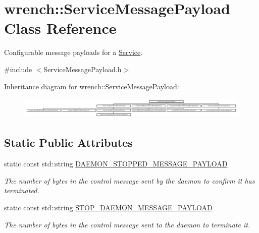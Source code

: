 \hypertarget{classwrench_1_1_service_message_payload}{}\section{wrench\+:\+:Service\+Message\+Payload Class Reference}
\label{classwrench_1_1_service_message_payload}


Configurable message payloads for a \hyperlink{classwrench_1_1_service}{Service}.  




{\ttfamily \#include $<$Service\+Message\+Payload.\+h$>$}

Inheritance diagram for wrench\+:\+:Service\+Message\+Payload\+:\begin{figure}[H]
\begin{center}
\leavevmode
\includegraphics[height=1.039926cm]{classwrench_1_1_service_message_payload}
\end{center}
\end{figure}
\subsection*{Static Public Attributes}
\begin{DoxyCompactItemize}
\item 
\mbox{\label{classwrench_1_1_service_message_payload_aec363c9226bc8285c41d9fff8c2814a9}} 
static const std\+::string \hyperlink{classwrench_1_1_service_message_payload_aec363c9226bc8285c41d9fff8c2814a9}{D\+A\+E\+M\+O\+N\+\_\+\+S\+T\+O\+P\+P\+E\+D\+\_\+\+M\+E\+S\+S\+A\+G\+E\+\_\+\+P\+A\+Y\+L\+O\+AD}
\begin{DoxyCompactList}\small\item\em The number of bytes in the control message sent by the daemon to confirm it has terminated. \end{DoxyCompactList}\item 
\mbox{\label{classwrench_1_1_service_message_payload_a9efb4a6b2c8876e17a3f636ba5ac17f6}} 
static const std\+::string \hyperlink{classwrench_1_1_service_message_payload_a9efb4a6b2c8876e17a3f636ba5ac17f6}{S\+T\+O\+P\+\_\+\+D\+A\+E\+M\+O\+N\+\_\+\+M\+E\+S\+S\+A\+G\+E\+\_\+\+P\+A\+Y\+L\+O\+AD}
\begin{DoxyCompactList}\small\item\em The number of bytes in the control message sent to the daemon to terminate it. \end{DoxyCompactList}\end{DoxyCompactItemize}


